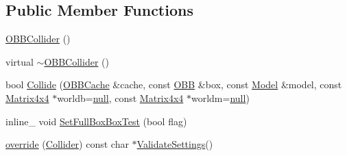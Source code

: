 \subsection*{Public Member Functions}
\begin{DoxyCompactItemize}
\item 
\hyperlink{classOpcode_1_1OBBCollider_aebdd293adf48509ccd61b4cb11cf5e6c}{O\+B\+B\+Collider} ()
\item 
virtual \hyperlink{classOpcode_1_1OBBCollider_ae9de47fc270d02d90fa5304690797c40}{$\sim$\+O\+B\+B\+Collider} ()
\item 
bool \hyperlink{classOpcode_1_1OBBCollider_a243f4dd2ddba99e708b1da21ff44f82a}{Collide} (\hyperlink{structOpcode_1_1OBBCache}{O\+B\+B\+Cache} \&cache, const \hyperlink{classOpcode_1_1OBB}{O\+BB} \&box, const \hyperlink{classOpcode_1_1Model}{Model} \&model, const \hyperlink{classOpcode_1_1Matrix4x4}{Matrix4x4} $\ast$worldb=\hyperlink{IceTypes_8h_ac97b8ee753e4405397a42ad5799b0f9e}{null}, const \hyperlink{classOpcode_1_1Matrix4x4}{Matrix4x4} $\ast$worldm=\hyperlink{IceTypes_8h_ac97b8ee753e4405397a42ad5799b0f9e}{null})
\item 
inline\+\_\+ void \hyperlink{classOpcode_1_1OBBCollider_abc50198d921f8d6db40b0cc82421fb76}{Set\+Full\+Box\+Box\+Test} (bool flag)
\item 
\hyperlink{classOpcode_1_1OBBCollider_a45dc6ab4f10ba72ef9381c6d0b5c18d2}{override} (\hyperlink{classOpcode_1_1Collider}{Collider}) const char $\ast$\hyperlink{classOpcode_1_1Collider_a9099aa79f7b57fe4018f37e967cc6be5}{Validate\+Settings}()
\end{DoxyCompactItemize}
